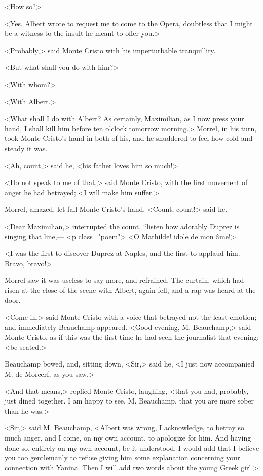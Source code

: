  <How so?> 

 <Yes. Albert wrote to request me to come to the Opera, doubtless that I might be a witness to the insult he meant to offer you.> 

 <Probably,> said Monte Cristo with his imperturbable tranquillity. 

 <But what shall you do with him?> 

 <With whom?> 

 <With Albert.> 

 <What shall I do with Albert? As certainly, Maximilian, as I now press your hand, I shall kill him before ten o'clock tomorrow morning.> Morrel, in his turn, took Monte Cristo's hand in both of his, and he shuddered to feel how cold and steady it was. 

 <Ah, count,> said he, <his father loves him so much!> 

 <Do not speak to me of that,> said Monte Cristo, with the first movement of anger he had betrayed; <I will make him suffer.> 

 Morrel, amazed, let fall Monte Cristo's hand. <Count, count!> said he. 

 <Dear Maximilian,> interrupted the count, “listen how adorably Duprez is singing that line,—  <p class="poem"> <O Mathilde! idole de mon âme!> 

 <I was the first to discover Duprez at Naples, and the first to applaud him. Bravo, bravo!> 

 Morrel saw it was useless to say more, and refrained. The curtain, which had risen at the close of the scene with Albert, again fell, and a rap was heard at the door. 

 <Come in,> said Monte Cristo with a voice that betrayed not the least emotion; and immediately Beauchamp appeared. <Good-evening, M. Beauchamp,> said Monte Cristo, as if this was the first time he had seen the journalist that evening; <be seated.> 

 Beauchamp bowed, and, sitting down, <Sir,> said he, <I just now accompanied M. de Morcerf, as you saw.> 

 <And that means,> replied Monte Cristo, laughing, <that you had, probably, just dined together. I am happy to see, M. Beauchamp, that you are more sober than he was.> 

 <Sir,> said M. Beauchamp, <Albert was wrong, I acknowledge, to betray so much anger, and I come, on my own account, to apologize for him. And having done so, entirely on my own account, be it understood, I would add that I believe you too gentlemanly to refuse giving him some explanation concerning your connection with Yanina. Then I will add two words about the young Greek girl.> 

